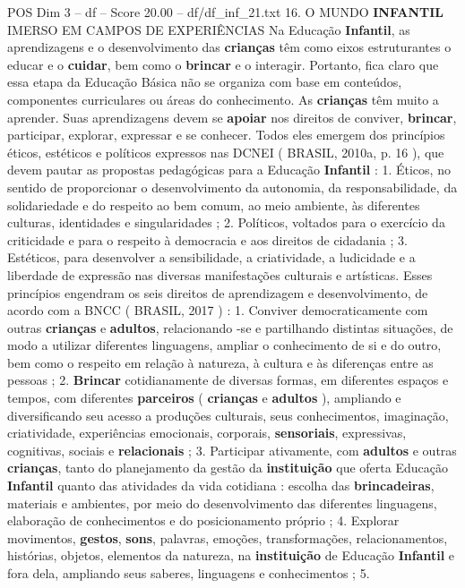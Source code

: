 \begin{textsample}{POS Dim 3 – df – Score 20.00 – df/df\_inf\_21.txt}  \label{ex:f3_pos_125}
16.
O MUNDO \textbf{INFANTIL} IMERSO EM CAMPOS DE EXPERIÊNCIAS Na Educação \textbf{Infantil}, as aprendizagens e o desenvolvimento das \textbf{crianças} têm como eixos estruturantes o educar e o \textbf{cuidar}, bem como o \textbf{brincar} e o interagir.
Portanto, fica claro que essa etapa da Educação Básica não se organiza com base em conteúdos, componentes curriculares ou áreas do conhecimento.
As \textbf{crianças} têm muito a aprender.
Suas aprendizagens devem se \textbf{apoiar} nos direitos de conviver, \textbf{brincar}, participar, explorar, expressar e se conhecer.
Todos eles emergem dos princípios éticos, estéticos e políticos expressos nas DCNEI ( BRASIL, 2010a, p. 16 ), que devem pautar as propostas pedagógicas para a Educação \textbf{Infantil} : 1.
Éticos, no sentido de proporcionar o desenvolvimento da autonomia, da responsabilidade, da solidariedade e do respeito ao bem comum, ao meio ambiente, às diferentes culturas, identidades e singularidades ; 2.
Políticos, voltados para o exercício da criticidade e para o respeito à democracia e aos direitos de cidadania ; 3.
Estéticos, para desenvolver a sensibilidade, a criatividade, a ludicidade e a liberdade de expressão nas diversas manifestações culturais e artísticas.
Esses princípios engendram os seis direitos de aprendizagem e desenvolvimento, de acordo com a BNCC ( BRASIL, 2017 ) : 1.
Conviver democraticamente com outras \textbf{crianças} e \textbf{adultos}, relacionando -se e partilhando distintas situações, de modo a utilizar diferentes linguagens, ampliar o conhecimento de si e do outro, bem como o respeito em relação à natureza, à cultura e às diferenças entre as pessoas ; 2. \textbf{Brincar} cotidianamente de diversas formas, em diferentes espaços e tempos, com diferentes \textbf{parceiros} ( \textbf{crianças} e \textbf{adultos} ), ampliando e diversificando seu acesso a produções culturais, seus conhecimentos, imaginação, criatividade, experiências emocionais, corporais, \textbf{sensoriais}, expressivas, cognitivas, sociais e \textbf{relacionais} ; 3.
Participar ativamente, com \textbf{adultos} e outras \textbf{crianças}, tanto do planejamento da gestão da \textbf{instituição} que oferta Educação \textbf{Infantil} quanto das atividades da vida cotidiana : escolha das \textbf{brincadeiras}, materiais e ambientes, por meio do desenvolvimento das diferentes linguagens, elaboração de conhecimentos e do posicionamento próprio ; 4.
Explorar movimentos, \textbf{gestos}, \textbf{sons}, palavras, emoções, transformações, relacionamentos, histórias, objetos, elementos da natureza, na \textbf{instituição} de Educação \textbf{Infantil} e fora dela, ampliando seus saberes, linguagens e conhecimentos ; 5.

\end{textsample}

